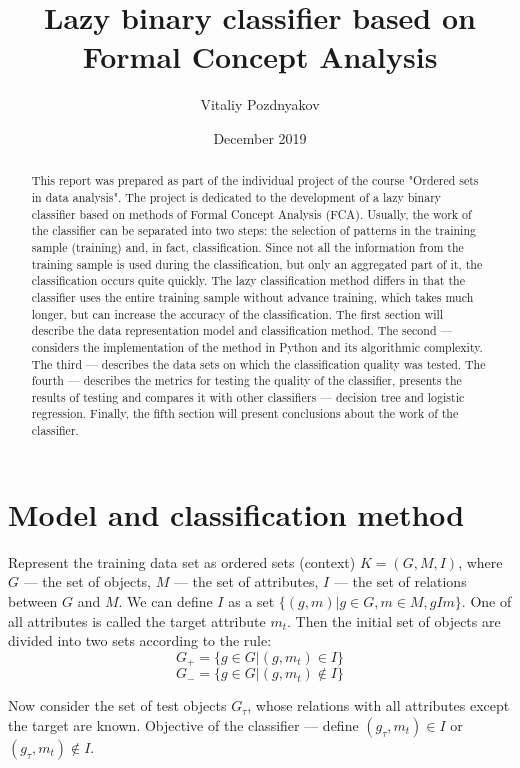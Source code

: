 \documentclass{article}
\author{Vitaliy Pozdnyakov}
\title{Lazy binary classifier based on \\Formal Concept Analysis}
\date{December 2019}
\begin{document}
\maketitle

\begin{abstract}
	This report was prepared as part of the individual project of the course "Ordered sets in data analysis". The project is dedicated to the development of a lazy binary classifier based on methods of Formal Concept Analysis (FCA). Usually, the work of the classifier can be separated into two steps: the selection of patterns in the training sample (training) and, in fact, classification. Since not all the information from the training sample is used during the classification, but only an aggregated part of it, the classification occurs quite quickly. The lazy classification method differs in that the classifier uses the entire training sample without advance training, which takes much longer, but can increase the accuracy of the classification. The first section will describe the data representation model and classification method. The second --- considers the implementation of the method in Python and its algorithmic complexity. The third --- describes the data sets on which the classification quality was tested. The fourth --- describes the metrics for testing the quality of the classifier, presents the results of testing and compares it with other classifiers --- decision tree and logistic regression. Finally, the fifth section will present conclusions about the work of the classifier.
\end{abstract}

\section{Model and classification method}

Represent the training data set as ordered sets (context) $K = (G, M, I)$, where $G$ --- the set of objects, $M$ --- the set of attributes, $I$ --- the set of relations between $G$ and $M$. We can define $I$ as a set $\{(g, m)|g \in G, m \in M, gIm\}$. One of all attributes is called the target attribute $m_t$. Then the initial set of objects are divided into two sets according to the rule:
$$G_+ = \{g \in G|(g, m_t) \in I\}$$
$$G_- = \{g \in G| (g, m_t) \notin I\}$$

Now consider the set of test objects $G_\tau$, whose relations with all attributes except the target are known. Objective of the classifier --- define $(g_\tau, m_t) \in I$ or $(g_\tau, m_t) \notin I$. 
\end{document}
